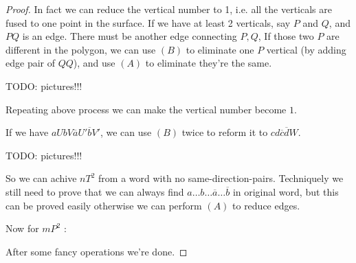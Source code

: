 \begin{proof}[Proof]
	In fact we can reduce the vertical number to 1, i.e. all the verticals are
	fused to one point in the surface.
	If we have at least 2 verticals, say $P$ and $Q$, and $PQ$ is an edge.
	There must be another edge connecting $P,Q$,
	If those two $P$ are different in the polygon, we can use $(B)$ to eliminate
	one $P$ vertical (by adding edge pair of $QQ$),
	and use $(A)$ to eliminate they're the same.

	TODO: pictures!!!

	Repeating above process we can make the vertical number become $1$.

	If we have $aUbV\overline{a}U'\overline{b}V'$, we can use $(B)$ twice to
	reform it to $cd\overline{c}\overline{d}W$.

	TODO: pictures!!!

	So we can achive $nT^2$ from a word with no same-direction-pairs. Techniquely
	we still need to prove that we can always
	find $a\dots b\dots \overline{a}\dots \overline{b}$ in original word,
	but this can be proved easily otherwise we can perform $(A)$ to reduce edges.

	Now for $mP^2$ :

	After some fancy operations we're done.
\end{proof}

